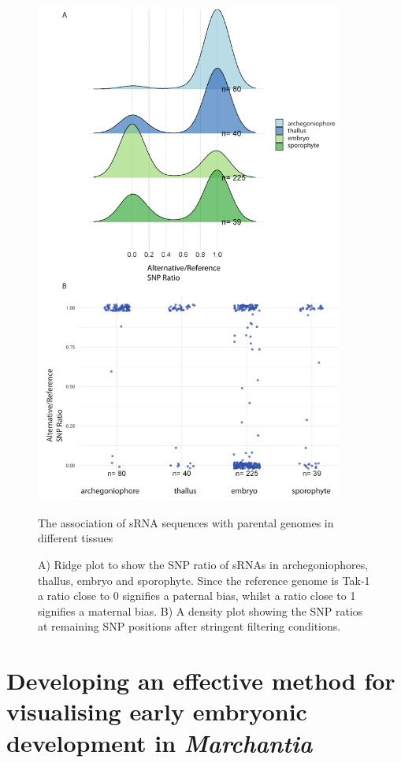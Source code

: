 \begin{figure}[htbp!] 
\centering    
    \includegraphics[width=0.9\textwidth]{Chapter3/Figs/Figure_sRNA_SNPs.pdf}
\caption{The association of sRNA sequences with parental genomes in different tissues}
\label{fig:sRNA_SNPs}
\captionsetup{font=small}
    \caption*{A) Ridge plot to show the SNP ratio of sRNAs in archegoniophores, thallus, embryo and sporophyte. Since the reference genome is Tak-1 a ratio close to 0 signifies a paternal bias, whilst a ratio close to 1 signifies a maternal bias. B) A density plot showing the SNP ratios at remaining SNP positions after stringent filtering conditions.}
\end{figure}

\clearpage

\section{Developing an effective method for visualising early embryonic development in \textit{Marchantia}}

